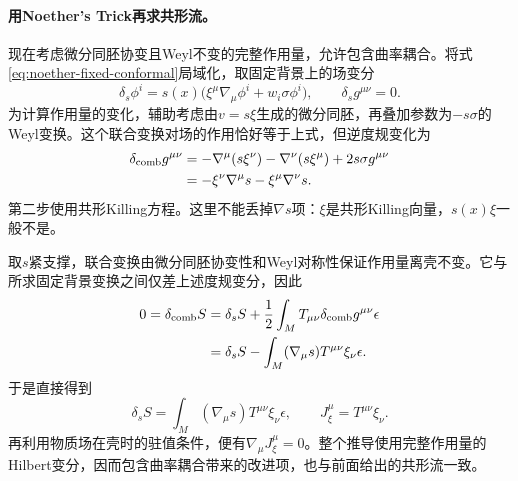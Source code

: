 \paragraph{用Noether's Trick再求共形流。}
现在考虑微分同胚协变且Weyl不变的完整作用量，允许包含曲率耦合。将式\eqref{eq:noether-fixed-conformal}局域化，取固定背景上的场变分
\begin{equation}
    \delta_s\phi^i=s(x)\bigl(\xi^\mu\nabla_\mu\phi^i+w_i\sigma\phi^i\bigr),
    \qquad\delta_s g^{\mu\nu}=0.
\end{equation}
为计算作用量的变化，辅助考虑由$v=s\xi$生成的微分同胚，再叠加参数为$-s\sigma$的Weyl变换。这个联合变换对场的作用恰好等于上式，但逆度规变化为
\begin{align}
    \delta_{\mathrm{comb}}g^{\mu\nu}
    &=-\nabla^\mu(s\xi^\nu)-\nabla^\nu(s\xi^\mu)
    +2s\sigma g^{\mu\nu}\notag\\
    &=-\xi^\nu\nabla^\mu s-\xi^\mu\nabla^\nu s.
\end{align}
第二步使用共形Killing方程。这里不能丢掉$\nabla s$项：$\xi$是共形Killing向量，$s(x)\xi$一般不是。

取$s$紧支撑，联合变换由微分同胚协变性和Weyl对称性保证作用量离壳不变。它与所求固定背景变换之间仅差上述度规变分，因此
\begin{align}
    0=\delta_{\mathrm{comb}}S
    &=\delta_sS+\frac12\int_M T_{\mu\nu}
    \delta_{\mathrm{comb}}g^{\mu\nu}\epsilon\notag\\
    &=\delta_sS-\int_M(\nabla_\mu s)T^{\mu\nu}\xi_\nu\epsilon.
\end{align}
于是直接得到
\begin{equation}
    \boxed{\delta_sS=\int_M(\nabla_\mu s)T^{\mu\nu}\xi_\nu\epsilon,
    \qquad J_\xi^\mu=T^{\mu\nu}\xi_\nu.}
\end{equation}
再利用物质场在壳时的驻值条件，便有$\nabla_\mu J_\xi^\mu=0$。整个推导使用完整作用量的Hilbert变分，因而包含曲率耦合带来的改进项，也与前面给出的共形流一致。

